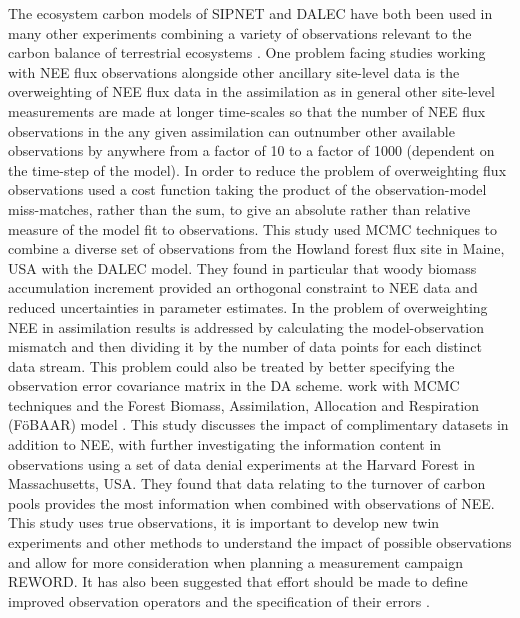\documentclass[12pt]{article}
\begin{document}
The ecosystem carbon models of SIPNET and DALEC have both been used in many other experiments combining a variety of observations relevant to the carbon balance of terrestrial ecosystems \citep{Zobitz2008, Moore20081467, Sacks2007, Keenan2011}. One problem facing studies working with NEE flux observations alongside other ancillary site-level data is the overweighting of NEE flux data in the assimilation as in general other site-level measurements are made at longer time-scales so that the number of NEE flux observations in the any given assimilation can outnumber other available observations by anywhere from a factor of 10 to a factor of 1000 (dependent on the time-step of the model). In order to reduce the problem of overweighting flux observations \citet{richardson2010estimating} used a cost function taking the product of the observation-model miss-matches, rather than the sum, to give an absolute rather than relative measure of the model fit to observations. This study used MCMC techniques to combine a diverse set of observations from the Howland forest flux site in Maine, USA with the DALEC model. They found in particular that woody biomass accumulation increment provided an orthogonal constraint to NEE data and reduced uncertainties in parameter estimates. In \citet{Keenan2012} the problem of overweighting NEE in assimilation results is addressed by calculating the model-observation mismatch and then dividing it by the number of data points for each distinct data stream. This problem could also be treated by better specifying the observation error covariance matrix in the DA scheme. \citet{Keenan2012} work with MCMC techniques and the Forest Biomass, Assimilation, Allocation and Respiration (F\"{o}BAAR) model . This study discusses the impact of complimentary datasets in addition to NEE, with \citet{Keenan2013} further investigating the information content in observations using a set of data denial experiments at the Harvard Forest in Massachusetts, USA. They found that data relating to the turnover of carbon pools provides the most information when combined with observations of NEE. This study uses true observations, it is important to develop new twin experiments and other methods to understand the impact of possible observations and allow for more consideration when planning a measurement campaign {\color{red}REWORD}. It has also been suggested that effort should be made to define improved observation operators and the specification of their errors \citet{rayner2010current, williams2009improving}.
\end{document}
